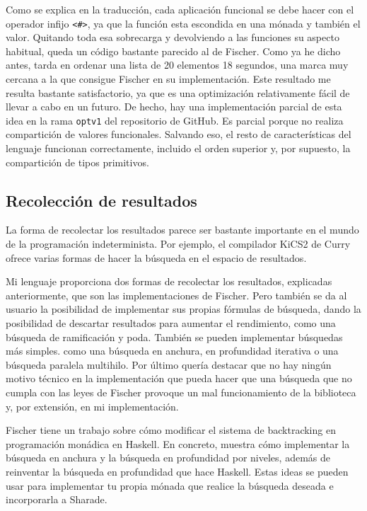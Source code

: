 \documentclass[class=article, crop=false]{standalone}
\begin{document}
Como se explica en la traducción, cada aplicación funcional se debe hacer con el operador
infijo \verb`<#>`, ya que la función esta escondida en una mónada y también el valor.
Quitando toda esa sobrecarga y devolviendo a las funciones su aspecto habitual, queda un
código bastante parecido al de Fischer. Como ya he dicho antes, tarda en ordenar una lista de
20 elementos 18 segundos, una marca muy cercana a la que consigue Fischer en su
implementación. Este resultado me resulta bastante satisfactorio, ya que es una optimización
relativamente fácil de llevar a cabo en un futuro. De hecho, hay una implementación parcial
de esta idea en la rama \verb`optv1` del repositorio de GitHub. Es parcial porque no realiza
compartición de valores funcionales. Salvando eso, el resto de características del lenguaje
funcionan correctamente, incluido el orden superior y, por supuesto, la compartición de tipos
primitivos.

\subsection{Recolección de resultados}

La forma de recolectar los resultados parece ser bastante importante en el mundo de la
programación indeterminista. Por ejemplo, el compilador KiCS2 de Curry ofrece varias formas
de hacer la búsqueda en el espacio de resultados\cite{hanus2012search}.

Mi lenguaje proporciona dos formas de recolectar los resultados, explicadas anteriormente,
que son las implementaciones de Fischer. Pero también se da al usuario la posibilidad de
implementar sus propias fórmulas de búsqueda, dando la posibilidad de descartar resultados
para aumentar el rendimiento, como una búsqueda de ramificación y poda. También se pueden
implementar búsquedas más simples. como una búsqueda en anchura, en profundidad iterativa o
una búsqueda paralela multihilo. Por último quería destacar que no hay ningún motivo técnico
en la implementación que pueda hacer que una búsqueda que no cumpla con las leyes de Fischer
provoque un mal funcionamiento de la biblioteca y, por extensión, en mi implementación.

Fischer tiene un trabajo\cite{fischer2009reinventing} sobre cómo modificar el sistema de
backtracking en programación monádica en Haskell. En concreto, muestra cómo implementar la
búsqueda en anchura y la búsqueda en profundidad por niveles, además de reinventar la
búsqueda en profundidad que hace Haskell. Estas ideas se pueden usar para implementar tu
propia mónada que realice la búsqueda deseada e incorporarla a Sharade.
\end{document}
